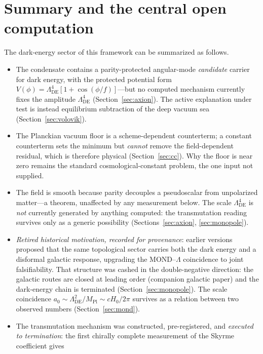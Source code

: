 \documentclass[11pt]{article}
\newcommand{\Mpl}{M_{\mathrm{Pl}}}
\newcommand{\LDE}{\Lambda_{\mathrm{DE}}}
\begin{document}
\section{Summary and the central open computation}
\label{sec:open}

The dark-energy sector of this framework can be summarized as follows.

\begin{itemize}
\item The condensate contains a parity-protected angular-mode
  \emph{candidate} carrier for dark energy, with the protected
  potential form $V(\phi)=\LDE^4[1+\cos(\phi/f)]$---but no computed
  mechanism currently fixes the amplitude $\LDE^4$
  (Section~\ref{sec:axion}).  The active explanation under test is
  instead equilibrium subtraction of the deep vacuum sea
  (Section~\ref{sec:volovik}).
\item The Planckian vacuum floor is a scheme-dependent counterterm; a
  constant counterterm sets the minimum but \emph{cannot} remove the
  field-dependent residual, which is therefore physical
  (Section~\ref{sec:cc}).  Why the floor is near zero remains the
  standard cosmological-constant problem, the one input not supplied.
\item The field is smooth because parity decouples a pseudoscalar
  from unpolarized matter---a theorem, unaffected by any measurement
  below.  The scale $\LDE^4$ is \emph{not} currently generated by
  anything computed: the transmutation reading survives only as a
  generic possibility (Sections~\ref{sec:axion},
  \ref{sec:monopole}).
\item \emph{Retired historical motivation, recorded for
  provenance}: earlier versions proposed that the same topological
  sector carries both the dark energy and a disformal galactic
  response, upgrading the MOND--$\Lambda$ coincidence to joint
  falsifiability.  That structure was cashed in the double-negative
  direction: the galactic routes are closed at leading order
  (companion galactic paper) and the dark-energy chain is terminated
  (Section~\ref{sec:monopole}).  The scale coincidence
  $a_0\sim\LDE^2/\Mpl\sim cH_0/2\pi$ survives as a relation between
  two observed numbers (Section~\ref{sec:mond}).
\item The transmutation mechanism was constructed, pre-registered,
  and \emph{executed to termination}: the first chirally complete
  measurement of the Skyrme coefficient gives

\end{itemize}
\end{document}

